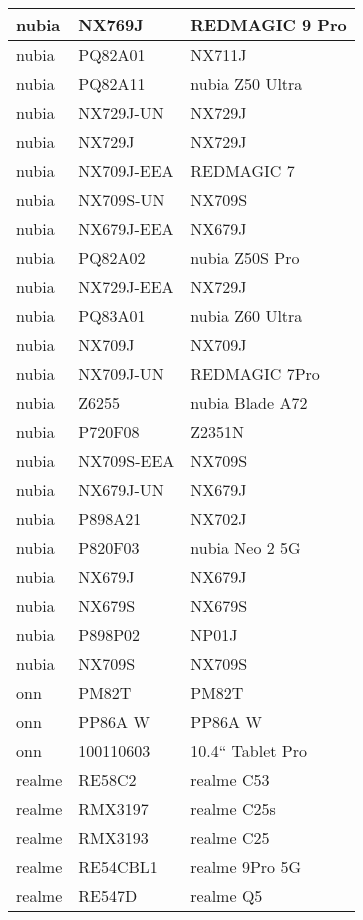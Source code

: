 \begin{tabularx}{\linewidth}{|l|X|X|}
        nubia & NX769J & REDMAGIC 9 Pro \\ \hline
        nubia & PQ82A01 & NX711J \\ \hline
        nubia & PQ82A11 & nubia Z50 Ultra \\ \hline
        nubia & NX729J-UN & NX729J \\ \hline
        nubia & NX729J & NX729J \\ \hline
        nubia & NX709J-EEA & REDMAGIC 7 \\ \hline
        nubia & NX709S-UN & NX709S \\ \hline
        nubia & NX679J-EEA & NX679J \\ \hline
        nubia & PQ82A02 & nubia Z50S Pro \\ \hline
        nubia & NX729J-EEA & NX729J \\ \hline
        nubia & PQ83A01 & nubia Z60 Ultra \\ \hline
        nubia & NX709J & NX709J \\ \hline
        nubia & NX709J-UN & REDMAGIC 7Pro \\ \hline
        nubia & Z6255 & nubia Blade A72 \\ \hline
        nubia & P720F08 & Z2351N \\ \hline
        nubia & NX709S-EEA & NX709S \\ \hline
        nubia & NX679J-UN & NX679J \\ \hline
        nubia & P898A21 & NX702J \\ \hline
        nubia & P820F03 & nubia Neo 2 5G \\ \hline
        nubia & NX679J & NX679J \\ \hline
        nubia & NX679S & NX679S \\ \hline
        nubia & P898P02 & NP01J \\ \hline
        nubia & NX709S & NX709S \\ \hline
        onn & PM82T & PM82T \\ \hline
        onn & PP86A W & PP86A W \\ \hline
        onn & 100110603 & 10.4“ Tablet Pro \\ \hline
        realme & RE58C2 & realme C53 \\ \hline
        realme & RMX3197 & realme C25s \\ \hline
        realme & RMX3193 & realme C25 \\ \hline
        realme & RE54CBL1 & realme 9Pro 5G \\ \hline
        realme & RE547D & realme Q5 \\ \hline

\end{tabularx}
